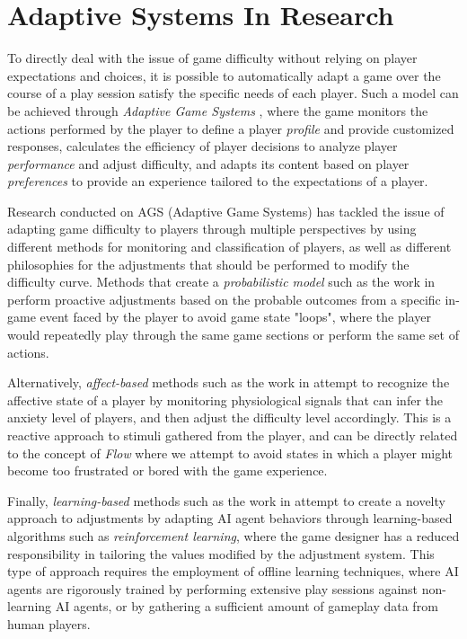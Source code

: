 
\section{Adaptive Systems In Research}

To directly deal with the issue of game difficulty without relying on player expectations and choices, it is possible to automatically adapt a game over the course of a play session satisfy the specific needs of each player. Such a model can be achieved through \emph{Adaptive Game Systems} \cite{ARTICLE_PlayerCentredGameDesign}, where the game monitors the actions performed by the player to define a player \emph{profile} and provide customized responses, calculates the efficiency of player decisions to analyze player \emph{performance} and adjust difficulty, and adapts its content based on player \emph{preferences} to provide an experience tailored to the expectations of a player.

Research conducted on AGS (Adaptive Game Systems) has tackled the issue of adapting game difficulty to players through multiple perspectives by using different methods for monitoring and classification of players, as well as different philosophies for the adjustments that should be performed to modify the difficulty curve. Methods that create a \emph{probabilistic model} such as the work in \cite{article_casefordda} perform proactive adjustments based on the probable outcomes from a specific in-game event faced by the player to avoid game state "loops", where the player would repeatedly play through the same game sections or perform the same set of actions.

Alternatively, \emph{affect-based} methods such as the work in \cite{article_affectivedda} attempt to recognize the affective state of a player by monitoring physiological signals that can infer the anxiety level of players, and then adjust the difficulty level accordingly. This is a reactive approach to stimuli gathered from the player, and can be directly related to the concept of \emph{Flow} where we attempt to avoid states in which a player might become too frustrated or bored with the game experience.

Finally, \emph{learning-based} methods such as the work in \cite{article_adaptivebehaviorai} attempt to create a novelty approach to adjustments by adapting AI agent behaviors through learning-based algorithms such as \emph{reinforcement learning}, where the game designer has a reduced responsibility in tailoring the values modified by the adjustment system. This type of approach requires the employment of offline learning techniques, where AI agents are rigorously trained by performing extensive play sessions against non-learning AI agents, or by gathering a sufficient amount of gameplay data from human players.

